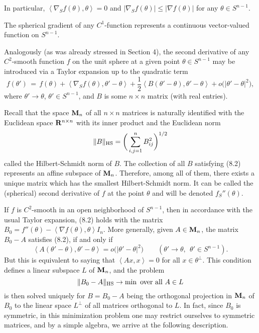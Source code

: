 \documentclass[reqno,12pt]{amsart}
\theoremstyle{plain}
\begin{document}
In particular, $\left<\nabla_S f(\theta),\theta\right> = 0$ and
$|\nabla_S f(\theta)| \leq |\nabla f(\theta)|$ for any 
$\theta \in S^{n-1}$.

The spherical gradient of any $C^1$-function represents a continuous 
vector-valued function on $S^{n-1}$.

Analogously (as was already stressed in Section 4), the second derivative 
of any $C^2$-smooth function $f$ on the unit sphere at a given point 
$\theta \in S^{n-1}$ may be introduced via a Taylor expansion up to 
the quadratic term
\begin{equation}
f(\theta')  \, = \, f(\theta) + 
\left<\nabla_S f(\theta),\theta' - \theta\right> +
\frac{1}{2} \left<B(\theta' - \theta),\theta' - \theta\right> +
o\big(|\theta' - \theta|^2\big),
\end{equation}
where $\theta' \rightarrow \theta$, $\theta' \in S^{n-1}$, and
$B$ is some $n \times n$ matrix (with real entries).

Recall that the space ${\bf M}_n$ of all $n \times n$ 
matrices is naturally identified with the Euclidean space ${{\bf R}}^{n \times n}$ 
with its inner product and the Euclidean norm
$$
\|B\|_{\rm HS} = \bigg(\sum_{i,j = 1}^n B_{ij}^2\bigg)^{1/2}
$$
called the Hilbert-Schmidt norm of $B$. The collection of all $B$ satisfying 
(8.2) represents an affine subspace of ${\bf M}_n$. Therefore, among all
of them, there exists a unique matrix which has the smallest Hilbert-Schmidt 
norm. It can be called the (spherical) second derivative of $f$ at the 
point $\theta$ and will be denoted $f_S''(\theta)$.

If $f$ is $C^2$-smooth in an open neighborhood of $S^{n-1}$, then in 
accordance with the usual Taylor expansion, (8.2) holds with the matrix
$
B_0 = f''(\theta) - \left<\nabla f(\theta),\theta\right> I_n.
$
More generally, given $A \in {\bf M}_n$, the matrix $B_0 - A$ satisfies 
(8.2), if and only if
$$
\left<A(\theta' - \theta),\theta' - \theta\right> = 
o\big(|\theta' - \theta|^2\big) \qquad
(\theta' \rightarrow \theta, \ \ \theta' \in S^{n-1}).
$$
But this is equivalent to saying that 
$\left<Ax,x\right> = 0$ for all $x \in \theta^\perp$. This condition 
defines a linear subspace $L$ of ${\bf M}_n$, and the problem 
$$
\|B_0 - A\|_{{\rm HS}} \rightarrow \min \ {\rm over \ all} \ A \in L
$$
is then solved uniquely for $B = B_0 - A$ being the orthogonal projection 
in ${\bf M}_n$ of $B_0$ to the linear space $L^\perp$ of all matrices
orthogonal to $L$.
In fact, since $B_0$ is symmetric, in this minimization problem one may 
restrict ourselves to symmetric matrices, and by a simple algebra, we 
arrive at the following description.
\end{document}
